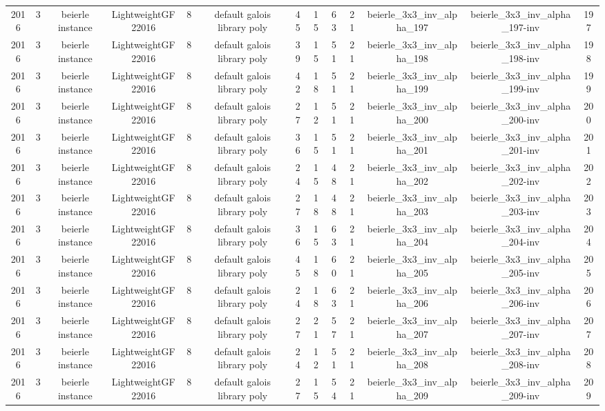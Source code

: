 \begin{tabular}{c c c c c c c c c c c c c}
2016 & 3 & beierle instance & LightweightGF22016 & 8 & default galois library poly & 45 & 15 & 63 & 21 & beierle_3x3_inv_alpha_197 & beierle_3x3_inv_alpha_197-inv & 197 \\
2016 & 3 & beierle instance & LightweightGF22016 & 8 & default galois library poly & 39 & 15 & 51 & 21 & beierle_3x3_inv_alpha_198 & beierle_3x3_inv_alpha_198-inv & 198 \\
2016 & 3 & beierle instance & LightweightGF22016 & 8 & default galois library poly & 42 & 18 & 51 & 21 & beierle_3x3_inv_alpha_199 & beierle_3x3_inv_alpha_199-inv & 199 \\
2016 & 3 & beierle instance & LightweightGF22016 & 8 & default galois library poly & 27 & 12 & 51 & 21 & beierle_3x3_inv_alpha_200 & beierle_3x3_inv_alpha_200-inv & 200 \\
2016 & 3 & beierle instance & LightweightGF22016 & 8 & default galois library poly & 36 & 15 & 51 & 21 & beierle_3x3_inv_alpha_201 & beierle_3x3_inv_alpha_201-inv & 201 \\
2016 & 3 & beierle instance & LightweightGF22016 & 8 & default galois library poly & 24 & 15 & 48 & 21 & beierle_3x3_inv_alpha_202 & beierle_3x3_inv_alpha_202-inv & 202 \\
2016 & 3 & beierle instance & LightweightGF22016 & 8 & default galois library poly & 27 & 18 & 48 & 21 & beierle_3x3_inv_alpha_203 & beierle_3x3_inv_alpha_203-inv & 203 \\
2016 & 3 & beierle instance & LightweightGF22016 & 8 & default galois library poly & 36 & 15 & 63 & 21 & beierle_3x3_inv_alpha_204 & beierle_3x3_inv_alpha_204-inv & 204 \\
2016 & 3 & beierle instance & LightweightGF22016 & 8 & default galois library poly & 45 & 18 & 60 & 21 & beierle_3x3_inv_alpha_205 & beierle_3x3_inv_alpha_205-inv & 205 \\
2016 & 3 & beierle instance & LightweightGF22016 & 8 & default galois library poly & 24 & 18 & 63 & 21 & beierle_3x3_inv_alpha_206 & beierle_3x3_inv_alpha_206-inv & 206 \\
2016 & 3 & beierle instance & LightweightGF22016 & 8 & default galois library poly & 27 & 21 & 57 & 21 & beierle_3x3_inv_alpha_207 & beierle_3x3_inv_alpha_207-inv & 207 \\
2016 & 3 & beierle instance & LightweightGF22016 & 8 & default galois library poly & 24 & 12 & 51 & 21 & beierle_3x3_inv_alpha_208 & beierle_3x3_inv_alpha_208-inv & 208 \\
2016 & 3 & beierle instance & LightweightGF22016 & 8 & default galois library poly & 27 & 15 & 54 & 21 & beierle_3x3_inv_alpha_209 & beierle_3x3_inv_alpha_209-inv & 209 \\

\end{tabular}
